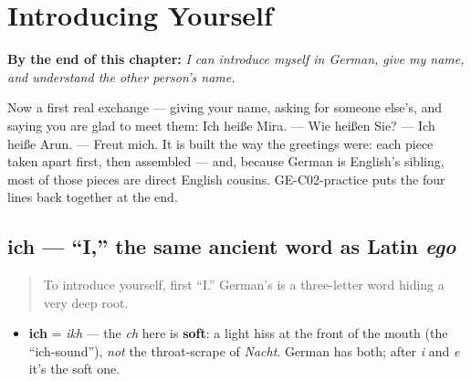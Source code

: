 
\chapter{Introducing Yourself}
\label{ch:introductions}

\begin{chapteropening}
\textbf{By the end of this chapter:} \emph{I can introduce myself in German, give my name, and understand the other person's name.}

Now a first real exchange — giving your name, asking for someone else's, and saying you are glad to meet them: Ich heiße Mira. — Wie heißen Sie? — Ich heiße Arun. — Freut mich. It is built the way the greetings were: each piece taken apart first, then assembled — and, because German is English's sibling, most of those pieces are direct English cousins. GE-C02-practice puts the four lines back together at the end.
\end{chapteropening}

\section[ich]{ich — \textquotedblleft{}I,\textquotedblright{} the same ancient word as Latin \emph{ego}}

\label{lesson:GE-C02-ich}



\begin{quote}
To introduce yourself, first \textquotedblleft{}I.\textquotedblright{} German's is a three-letter word hiding a very deep root.
\end{quote}

\begin{sounds}
\begin{itemize}
\raggedright
  \item \textbf{ich} = \emph{ikh} — the \emph{ch} here is \textbf{soft}: a light hiss at the front of the mouth (the \textquotedblleft{}ich-sound\textquotedblright{}), \emph{not} the throat-scrape of \emph{Nacht}. German has both; after \emph{i} and \emph{e} it's the soft one.
\end{itemize}
\end{sounds}

